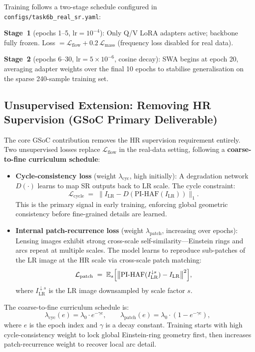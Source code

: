 \documentclass[11pt,a4paper]{article}
\newcommand{\bE}{\mathbb{E}}
\newcommand{\Lcyc}{\mathcal{L}_{\text{cycle}}}
\newcommand{\Lflow}{\mathcal{L}_{\text{flow}}}
\newcommand{\Lmass}{\mathcal{L}_{\text{mass}}}
\newcommand{\Lpatch}{\mathcal{L}_{\text{patch}}}
\begin{document}
Training follows a two-stage schedule configured in \texttt{configs/task6b\_real\_sr.yaml}:

\textbf{Stage~1} (epochs 1--5, $\text{lr}=10^{-4}$): Only Q/V LoRA adapters active; backbone fully frozen. Loss $= \Lflow + 0.2\,\Lmass$ (frequency loss disabled for real data).

\textbf{Stage~2} (epochs 6--30, $\text{lr}=5\times10^{-6}$, cosine decay): SWA begins at epoch 20, averaging adapter weights over the final 10 epochs to stabilise generalisation on the sparse 240-sample training set.

\subsection{Unsupervised Extension: Removing HR Supervision (GSoC Primary Deliverable)}

The core GSoC contribution removes the HR supervision requirement entirely. Two unsupervised losses replace $\Lflow$ in the real-data setting, following a \textbf{coarse-to-fine curriculum schedule}:

\begin{itemize}
  \item \textbf{Cycle-consistency loss} (weight $\lambda_{\text{cyc}}$, high initially): A degradation network $D(\cdot)$ learns to map SR outputs back to LR scale. The cycle constraint:
    \begin{equation}
      \Lcyc \;=\; \bigl\|I_{\text{LR}} - D(\text{PI-HAF}(I_{\text{LR}}))\bigr\|_1.
    \end{equation}
    This is the primary signal in early training, enforcing global geometric consistency before fine-grained details are learned.

  \item \textbf{Internal patch-recurrence loss} (weight $\lambda_{\text{patch}}$, increasing over epochs): Lensing images exhibit strong cross-scale self-similarity---Einstein rings and arcs repeat at multiple scales. The model learns to reproduce sub-patches of the LR image at the HR scale via cross-scale patch matching:
    \begin{equation}
      \Lpatch \;=\; \bE_{s}\Bigl[\bigl\|\text{PI-HAF}(I_{\text{LR}}^{\downarrow s}) - I_{\text{LR}}\bigr\|^2\Bigr],
    \end{equation}
    where $I_{\text{LR}}^{\downarrow s}$ is the LR image downsampled by scale factor $s$.
\end{itemize}

The coarse-to-fine curriculum schedule is:
\begin{equation}
  \lambda_{\text{cyc}}(e) = \lambda_0 \cdot e^{-\gamma e}, \qquad
  \lambda_{\text{patch}}(e) = \lambda_0 \cdot (1 - e^{-\gamma e}),
\end{equation}
where $e$ is the epoch index and $\gamma$ is a decay constant. Training starts with high cycle-consistency weight to lock global Einstein-ring geometry first, then increases patch-recurrence weight to recover local arc detail.
\end{document}
